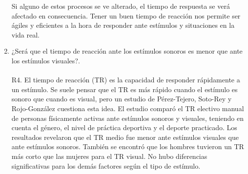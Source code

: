 \documentclass[11pt]{article}
\begin{document}
\begin{multicols}{2}
\begin{enumerate}
            Si alguno de estos procesos se ve alterado, el tiempo de respuesta se verá afectado en consecuencia. Tener un buen tiempo de reacción nos permite ser ágiles y eficientes a la hora de responder ante estímulos y situaciones en la vida real.

            \item ¿Será que el tiempo de reacción ante los estímulos sonoros es menor que ante los estímulos visuales?.\\\\
            R4. El tiempo de reacción (TR) es la capacidad de responder rápidamente a un estímulo. Se suele pensar que el TR es más rápido cuando el estímulo es sonoro que cuando es visual, pero un estudio de Pérez-Tejero, Soto-Rey y Rojo-González cuestiona esta idea. El estudio comparó el TR electivo manual de personas físicamente activas ante estímulos sonoros y visuales, teniendo en cuenta el género, el nivel de práctica deportiva y el deporte practicado. Los resultados revelaron que el TR medio fue menor ante estímulos visuales que ante estímulos sonoros. También se encontró que los hombres tuvieron un TR más corto que las mujeres para el TR visual. No hubo diferencias significativas para los demás factores según el tipo de estímulo.


\end{enumerate}
\end{multicols}
\end{document}
